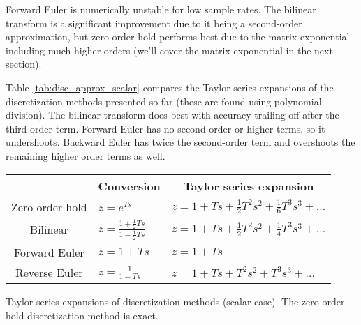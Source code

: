 Forward Euler is numerically unstable for low sample rates. The bilinear
transform is a significant improvement due to it being a second-order
approximation, but zero-order hold performs best due to the matrix exponential
including much higher orders (we'll cover the matrix exponential in the next
section).

Table \ref{tab:disc_approx_scalar} compares the Taylor series expansions of the
discretization methods presented so far (these are found using polynomial
division). The bilinear transform does best with accuracy trailing off after the
third-order term. Forward Euler has no second-order or higher terms, so it
undershoots. Backward Euler has twice the second-order term and overshoots the
remaining higher order terms as well.
\begin{booktable}
  \begin{tabular}{|cll|}
    \hline
    \rowcolor{headingbg}
    \multicolumn{1}{|c}{\textbf{Method}} &
      \multicolumn{1}{c}{\textbf{Conversion}} &
      \multicolumn{1}{c|}{\textbf{Taylor series expansion}} \\
    \hline
    Zero-order hold &
      $z = e^{Ts}$ &
      $z = 1 + Ts + \frac{1}{2}T^2s^2 + \frac{1}{6}T^3s^3 + \ldots$ \\
    Bilinear &
      $z = \frac{1 + \frac{1}{2}Ts}{1 - \frac{1}{2}Ts}$ &
      $z = 1 + Ts + \frac{1}{2}T^2s^2 + \frac{1}{4}T^3s^3 + \ldots$ \\
    Forward Euler &
      $z = 1 + Ts$ &
      $z = 1 + Ts$ \\
    Reverse Euler &
      $z = \frac{1}{1 - Ts}$ &
      $z = 1 + Ts + T^2s^2 + T^3s^3 + \ldots$ \\
    \hline
  \end{tabular}
  \caption{Taylor series expansions of discretization methods (scalar case). The
    zero-order hold discretization method is exact.}
  \label{tab:disc_approx_scalar}
\end{booktable}
